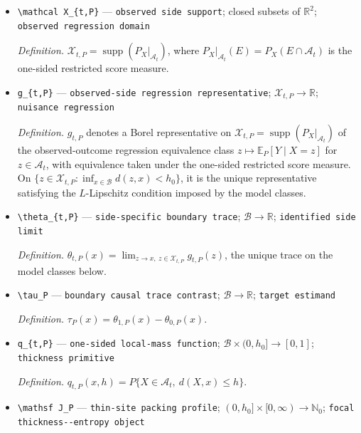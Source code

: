 \documentclass{article}
\begin{document}
\begin{itemize}
  \par\smallskip\noindent\emph{Definition.} \(d(x,z)=\lVert x-z\rVert_2\).
  \item \texttt{\textbackslash{}\allowbreak{}mathcal X\_\allowbreak{}\{t,\allowbreak{}P\}\allowbreak{}} --- \texttt{observed side support}; closed subsets of \(\mathbb R^2\); \texttt{observed regression domain}
  \par\smallskip\noindent\emph{Definition.} \(\mathcal X_{t,P}=\operatorname{supp}(P_X|_{\mathcal A_t})\), where \(P_X|_{\mathcal A_t}(E)=P_X(E\cap\mathcal A_t)\) is the one-sided restricted score measure.
  \item \texttt{g\_\allowbreak{}\{t,\allowbreak{}P\}\allowbreak{}} --- \texttt{observed-\allowbreak{}side regression representative}; \(\mathcal X_{t,P}\to\mathbb R\); \texttt{nuisance regression}
  \par\smallskip\noindent\emph{Definition.} \(g_{t,P}\) denotes a Borel representative on \(\mathcal X_{t,P}=\operatorname{supp}(P_X|_{\mathcal A_t})\) of the observed-outcome regression equivalence class \(z\mapsto\mathbb E_P[Y\mid X=z]\) for \(z\in\mathcal A_t\), with equivalence taken under the one-sided restricted score measure. On \(\{z\in\mathcal X_{t,P}:\inf_{x\in\mathcal B}d(z,x)<h_0\}\), it is the unique representative satisfying the \(L\)-Lipschitz condition imposed by the model classes.
  \item \texttt{\textbackslash{}\allowbreak{}theta\_\allowbreak{}\{t,\allowbreak{}P\}\allowbreak{}} --- \texttt{side-\allowbreak{}specific boundary trace}; \(\mathcal B\to\mathbb R\); \texttt{identified side limit}
  \par\smallskip\noindent\emph{Definition.} \(\theta_{t,P}(x)=\lim_{z\to x,\ z\in\mathcal X_{t,P}}g_{t,P}(z)\), the unique trace on the model classes below.
  \item \texttt{\textbackslash{}\allowbreak{}tau\_\allowbreak{}P} --- \texttt{boundary causal trace contrast}; \(\mathcal B\to\mathbb R\); \texttt{target estimand}
  \par\smallskip\noindent\emph{Definition.} \(\tau_P(x)=\theta_{1,P}(x)-\theta_{0,P}(x)\).
  \item \texttt{q\_\allowbreak{}\{t,\allowbreak{}P\}\allowbreak{}} --- \texttt{one-\allowbreak{}sided local-\allowbreak{}mass function}; \(\mathcal B\times(0,h_0]\to[0,1]\); \texttt{thickness primitive}
  \par\smallskip\noindent\emph{Definition.} \(q_{t,P}(x,h)=P\{X\in\mathcal A_t,\ d(X,x)\le h\}\).
  \item \texttt{\textbackslash{}\allowbreak{}mathsf J\_\allowbreak{}P} --- \texttt{thin-\allowbreak{}site packing profile}; \((0,h_0]\times[0,\infty)\to\mathbb N_0\); \texttt{focal thickness-\allowbreak{}-\allowbreak{}entropy object}

\end{itemize}
\end{document}
